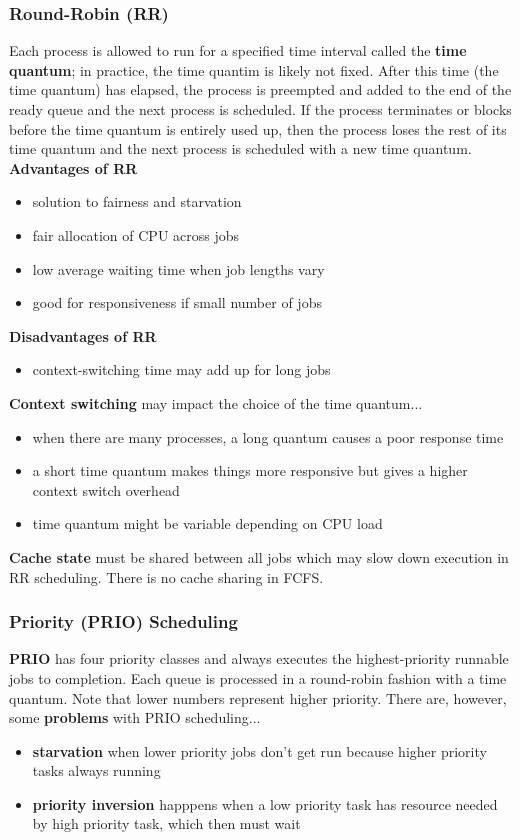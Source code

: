 \documentclass{article}
\newcommand{\bold}[1]{\textbf{#1}}
\renewcommand{\b}{\item[$\circ$]}
\newcommand{\newlist}{\begin{itemize}}
\renewcommand{\endlist}{\end{itemize}}
\begin{document}
    \subsubsection{Round-Robin (RR)}

    Each process is allowed to run for a specified time interval called the \bold{time quantum}; in practice, the time quantim is likely not fixed. After this time (the time quantum) has elapsed, the process is preempted and added to the end of the ready queue and the next process is scheduled. If the process terminates or blocks before the time quantum is entirely used up, then the process loses the rest of its time quantum and the next process is scheduled with a new time quantum. \\
    
    \noindent \bold{Advantages of RR}

    \newlist
    \b solution to fairness and starvation
    \b fair allocation of CPU across jobs
    \b low average waiting time when job lengths vary
    \b good for responsiveness if small number of jobs
    \endlist

    \noindent \bold{Disadvantages of RR}

    \newlist
    \b context-switching time may add up for long jobs
    \endlist 

    \noindent \bold{Context switching} may impact the choice of the time quantum...

    \newlist
    \b when there are many processes, a long quantum causes a poor response time
    \b a short time quantum makes things more responsive but gives a higher context switch overhead
    \b time quantum might be variable depending on CPU load
    \endlist

    \noindent \bold{Cache state} must be shared between all jobs which may slow down execution in RR scheduling. There is no cache sharing in FCFS. 

    \subsubsection{Priority (PRIO) Scheduling}

    \bold{PRIO} has four priority classes and always executes the highest-priority runnable jobs to completion. Each queue is processed in a round-robin fashion with a time quantum. Note that lower numbers represent higher priority. There are, however, some \bold{problems} with PRIO scheduling...

    \newlist
    \b \bold{starvation} when lower priority jobs don't get run because higher priority tasks always running
    \b \bold{priority inversion} happpens when a low priority task has resource needed by high priority task, which then must wait
    \endlist
\end{document}
